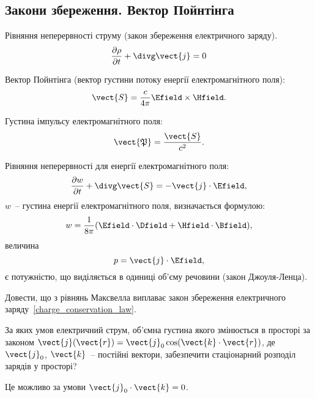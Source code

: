 \subsection*{Закони збереження. Вектор Пойнтінга}

\begin{Theory}
Рівняння неперервності струму (закон збереження електричного заряду).
	\begin{equation} \label{charge_conservation_law}
		\frac{\partial \rho}{\partial t} + \divg\vect{j} = 0
	\end{equation}

Вектор Пойнтінга (вектор густини потоку енергії електромагнітного поля):
	\begin{equation}
			\vect{S} = \frac{c}{4\pi} \Efield\times\Hfield.
	\end{equation}

Густина імпульсу електромагнітного поля:
\begin{equation}
	\vect{\mathfrak{P}} = \frac{\vect{S}}{c^2}.
\end{equation}

Рівняння неперервності для енергії електромагнітного поля:
	\begin{equation}
		\frac{\partial w}{\partial t} + \divg\vect{S} = -  \vect{j}\cdot\Efield,
	\end{equation}
$ w $~-- густина енергії електромагнітного поля, визначається формулою:
	\begin{equation}
		w = \frac{1}{8\pi} (\Efield\cdot\Dfield + \Hfield\cdot\Bfield),
	\end{equation}
величина
	\begin{equation}
		p =\vect{j}\cdot\Efield ,
	\end{equation}
є потужністю, що виділяється в одиниці об'єму речовини (закон Джоуля-Ленца).
\end{Theory}


\begin{problem}
    Довести, що з рівнянь Максвелла виплаває закон збереження електричного заряду~\ref{charge_conservation_law}.
\end{problem}

\begin{problem}
За яких умов електричний струм, об'ємна густина якого змінюється в просторі за законом  $\vect{j}(\vect{r}) = \vect{j}_0\cos(\vect{k}\cdot\vect{r})$, де $\vect{j}_0$, $\vect{k}$~-- постійні вектори, забезпечити стаціонарний розподіл зарядів у просторі?
\begin{solution}
	Це можливо за умови $\vect{j}_0\cdot\vect{k} = 0$.
\end{solution}
\end{problem}

